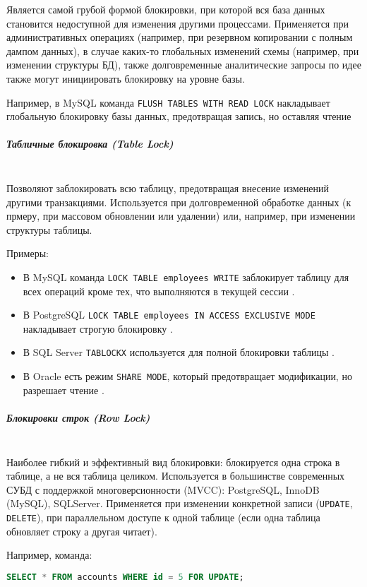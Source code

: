  Является самой грубой формой блокировки, при которой вся база данных становится недоступной для изменения другими процессами. Применяется при административных операциях (например, при резервном копировании с полным дампом данных), в случае каких-то глобальных изменений схемы (например, при изменении структуры БД), также долговременные аналитические запросы по идее также могут инициировать блокировку на уровне базы.
 
 Например, в MySQL команда \texttt{FLUSH TABLES WITH READ LOCK} накладывает глобальную блокировку базы данных, предотвращая запись, но оставляя чтение \autocite[§15.7.8.3]{Mysqldoc5}
 
 \subparagraph{Табличные блокировка (Table Lock)} ~\\

 Позволяют заблокировать всю таблицу, предотвращая внесение изменений другими транзакциями. Используется при долговременной обработке данных (к прмеру, при массовом обновлении или удалении) или, например, при изменении структуры таблицы.
 
 Примеры:
 \begin{itemize}
     \item В MySQL команда \texttt{LOCK TABLE employees WRITE} заблокирует таблицу для всех операций кроме тех, что выполняются в текущей сессии \autocite[§15.3.6]{Mysqldoc5}.
     \item В PostgreSQL \texttt{LOCK TABLE employees IN ACCESS EXCLUSIVE MODE} накладывает строгую блокировку \autocite{PgReference1}.
     \item В SQL Server \texttt{TABLOCKX} используется для полной блокировки таблицы \autocite{MicrosoftLearnSQLserverTabHints}.
     \item В Oracle есть режим \texttt{SHARE MODE}, который предотвращает модификации, но разрешает чтение \autocite[ch.18]{oracledbreference}.
 \end{itemize}
 
 \subparagraph{Блокировки строк (Row Lock)} ~\\

 Наиболее гибкий и эффективный вид блокировки: блокируется одна строка в таблице, а не вся таблица целиком. Используется в большинстве современных СУБД с поддержкой многоверсионности (MVCC): PostgreSQL, InnoDB (MySQL), SQLServer.
 Применяется при изменении конкретной записи (\texttt{UPDATE}, \texttt{DELETE}), при параллельном доступе к одной таблице (если одна таблица обновляет строку а другая читает).
 
 Например, команда:
 \begin{lstlisting}[language=SQL]
     SELECT * FROM accounts WHERE id = 5 FOR UPDATE;
 \end{lstlisting}

